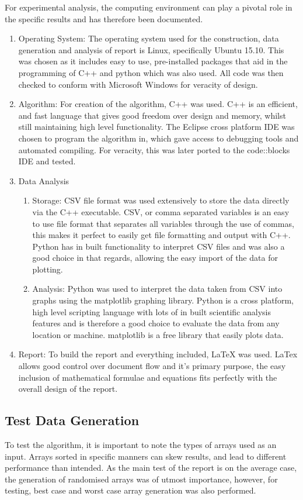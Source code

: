 \documentclass[]{article}
\begin{document}
For experimental analysis, the computing environment can play a pivotal role in the specific results and has therefore been documented. 
\begin{enumerate}
	\item Operating System: The operating system used for the construction, data generation and analysis of report is Linux, specifically Ubuntu 15.10. This was chosen as it includes easy to use, pre-installed packages that aid in the programming of C++ and python which was also used. All code was then checked to conform with Microsoft Windows for veracity of design.
	\item Algorithm: For creation of the algorithm, C++ was used. C++ is an efficient, and fast language that gives good freedom over design and memory, whilst still maintaining high level functionality. The Eclipse cross platform IDE was chosen to program the algorithm in, which gave access to debugging tools and automated compiling. For veracity, this was later ported to the code::blocks IDE and tested.
	\item Data Analysis
\begin{enumerate}
	\item Storage: CSV file format was used extensively to store the data directly via the C++ executable. CSV, or comma separated variables is an easy to use file format that separates all variables through the use of commas, this makes it perfect to easily get file formatting and output with C++. Python has in built functionality to interpret CSV files and was also a good choice in that regards, allowing the easy import of the data for plotting.
	\item Analysis: Python was used to interpret the data taken from CSV into graphs using the matplotlib graphing library. Python is a cross platform, high level scripting language with lots of in built scientific analysis features and is therefore a good choice to evaluate the data from any location or machine. matplotlib is a free library that easily plots data. 
\end{enumerate}
	\item Report: To build the report and everything included, LaTeX was used. LaTex allows good control over document flow and it's primary purpose, the easy inclusion of mathematical formulae and equations fits perfectly with the overall design of the report.
\end{enumerate}
\subsection{Test Data Generation}
To test the algorithm, it is important to note the types of arrays used as an input. Arrays sorted in specific manners can skew results, and lead to different performance than intended. As the main test of the report is on the average case, the generation of randomised arrays was of utmost importance, however, for testing, best case and worst case array generation was also performed. 
\end{document}
